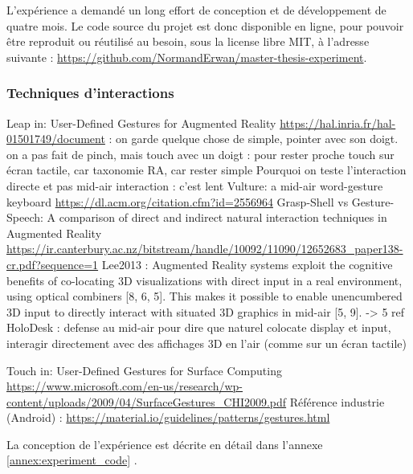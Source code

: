 L'expérience a demandé un long effort de conception et de développement de quatre mois. Le code source du projet est donc disponible en ligne, pour pouvoir être reproduit ou réutilisé au besoin, sous la license libre MIT, à l'adresse suivante : \url{https://github.com/NormandErwan/master-thesis-experiment}.

\subsubsection{Techniques d'interactions}
Leap in:
User-Defined Gestures for Augmented Reality \url{https://hal.inria.fr/hal-01501749/document} : on garde quelque chose de simple, pointer avec son doigt. on a pas fait de pinch, mais touch avec un doigt : pour rester proche touch sur écran tactile, car taxonomie RA, car rester simple
Pourquoi on teste l'interaction directe et pas mid-air interaction : c'est lent Vulture: a mid-air word-gesture keyboard \url{https://dl.acm.org/citation.cfm?id=2556964}
Grasp-Shell vs Gesture-Speech: A comparison of direct and indirect natural interaction
techniques in Augmented Reality \url{https://ir.canterbury.ac.nz/bitstream/handle/10092/11090/12652683_paper138-cr.pdf?sequence=1}
Lee2013 : Augmented Reality systems exploit the cognitive benefits of co-locating 3D visualizations with direct input in a real environment, using optical combiners [8, 6, 5]. This makes it possible to enable unencumbered 3D input to directly interact with situated 3D graphics in mid-air [5, 9]. -> 5 ref HoloDesk : defense au mid-air pour dire que naturel colocate display et input, interagir directement avec des affichages 3D en l'air (comme sur un écran tactile)

Touch in:
User-Defined Gestures for Surface Computing \url{https://www.microsoft.com/en-us/research/wp-content/uploads/2009/04/SurfaceGestures_CHI2009.pdf}
Référence industrie (Android) : \url{https://material.io/guidelines/patterns/gestures.html}

La conception de l'expérience est décrite en détail dans l'annexe \ref{annex:experiment_code} .

